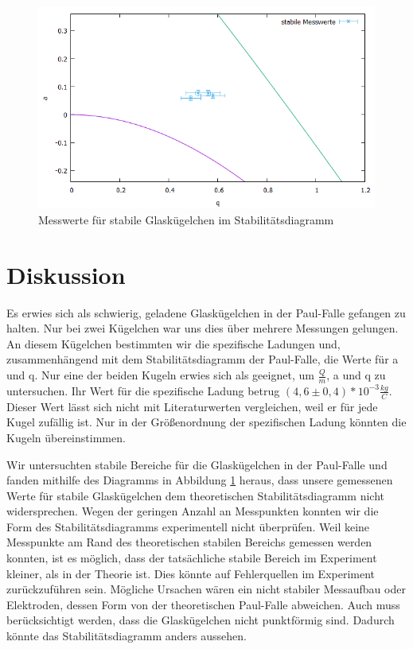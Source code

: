 \documentclass[10pt,a4paper]{article}
\begin{document}
\begin{figure}[h]
	\includegraphics[scale = 0.7]{stabiler_bereich.png}
	\centering
	\caption{Messwerte für stabile Glaskügelchen im Stabilitätsdiagramm}
	\label{stabiler_bereich1}
\end{figure}

\section{Diskussion}

Es erwies sich als schwierig, geladene Glaskügelchen in der Paul-Falle gefangen zu halten. Nur bei zwei Kügelchen war uns dies über mehrere Messungen gelungen. An diesem Kügelchen bestimmten wir die spezifische Ladungen und, zusammenhängend mit dem Stabilitätsdiagramm der Paul-Falle, die Werte für a und q.
Nur eine der beiden Kugeln erwies sich als geeignet, um $\frac{Q}{m}$, a und q zu untersuchen. Ihr Wert für die spezifische Ladung betrug $(4,6 \pm 0,4)*10^{-3} \frac{kg}{C}$. Dieser Wert lässt sich nicht mit Literaturwerten vergleichen, weil er für jede Kugel zufällig ist. Nur in der Größenordnung der spezifischen Ladung könnten die Kugeln übereinstimmen.

Wir untersuchten stabile Bereiche für die Glaskügelchen in der Paul-Falle und fanden mithilfe des Diagramms in Abbildung \ref{stabiler_bereich1} heraus, dass unsere gemessenen Werte für stabile Glaskügelchen dem theoretischen Stabilitätsdiagramm nicht widersprechen. Wegen der geringen Anzahl an Messpunkten konnten wir die Form des Stabilitätsdiagramms experimentell nicht überprüfen. Weil keine Messpunkte am Rand des theoretischen stabilen Bereichs gemessen werden konnten, ist es möglich, dass der tatsächliche stabile Bereich im Experiment kleiner, als in der Theorie ist. Dies könnte auf Fehlerquellen im Experiment zurückzuführen sein. Mögliche Ursachen wären ein nicht stabiler Messaufbau oder Elektroden, dessen Form von der theoretischen Paul-Falle abweichen. Auch muss berücksichtigt werden, dass die Glaskügelchen nicht punktförmig sind. Dadurch könnte das Stabilitätsdiagramm anders aussehen.
\end{document}
